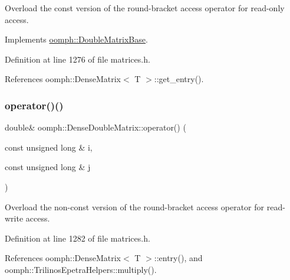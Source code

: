 Overload the const version of the round-\/bracket access operator for read-\/only access. 



Implements \hyperlink{classoomph_1_1DoubleMatrixBase_a20b85f0286f80464f42f0846fede2d77}{oomph\+::\+Double\+Matrix\+Base}.



Definition at line 1276 of file matrices.\+h.



References oomph\+::\+Dense\+Matrix$<$ T $>$\+::get\+\_\+entry().

\mbox{\label{classoomph_1_1DenseDoubleMatrix_a7314543c82d096181957979f2c16127c}} 
\subsubsection{\texorpdfstring{operator()()}{operator()()}\hspace{0.1cm}{\footnotesize\ttfamily [2/2]}}
{\footnotesize\ttfamily double\& oomph\+::\+Dense\+Double\+Matrix\+::operator() (\begin{DoxyParamCaption}\item[{const unsigned long \&}]{i,  }\item[{const unsigned long \&}]{j }\end{DoxyParamCaption})\hspace{0.3cm}{\ttfamily [inline]}}



Overload the non-\/const version of the round-\/bracket access operator for read-\/write access. 



Definition at line 1282 of file matrices.\+h.



References oomph\+::\+Dense\+Matrix$<$ T $>$\+::entry(), and oomph\+::\+Trilinos\+Epetra\+Helpers\+::multiply().

\mbox{\label{classoomph_1_1DenseDoubleMatrix_a68af8c2bf36da97d198e20f3a9cb466d}} 
